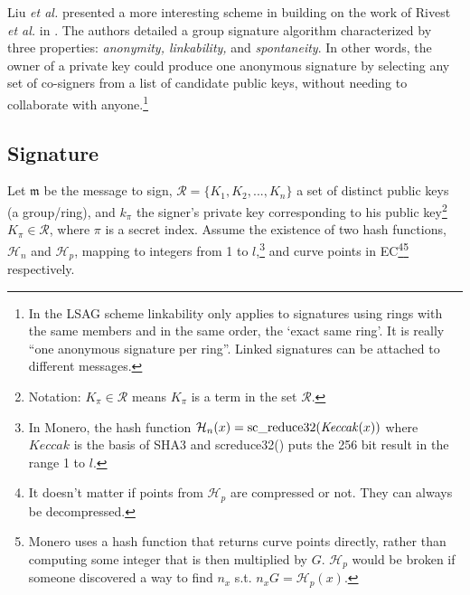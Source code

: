Liu {\em et al.} presented a more interesting scheme in \cite{Liu2004} building on the work of Rivest {\em et al.} in \cite{rivest-leak-secret}. The authors detailed a group signature algorithm characterized by three properties: {\em anonymity, linkability,} and {\em spontaneity}. In other words, the owner of a private key could produce one anonymous signature by selecting any set of co-signers from a list of candidate public keys, without needing to collaborate with anyone.\footnote{\label{lsag_linkability_note}In the LSAG scheme linkability only applies to signatures using rings with the same members and in the same order, the `exact same ring’. It is really ``one anonymous signature per ring”. Linked signatures can be attached to different messages.}


\subsection*{Signature}

Let \(\mathfrak{m}\) be the message to sign, \(\mathcal{R} = \{K_1, K_2, ..., K_n\}\) a set of distinct public keys (a group/ring), and \(k_\pi\) the signer's private key corresponding to his public key\footnote{\label{notation2_note}Notation: $K_{\pi} \in \mathcal{R}$ means $K_{\pi}$ is a term in the set $\mathcal{R}$.} \(K_\pi \in \mathcal{R}\), where $\pi$ is a secret index. Assume the existence of two hash functions, \(\mathcal{H}_n\) and \(\mathcal{H}_p\),
mapping to integers from 1 to $l$,\footnote{In Monero, the hash function $\mathcal{H}_n(x) = \textrm{sc\textunderscore reduce32}(\mathit{Keccak}(x))$ where $\mathit{Keccak}$ is the basis of SHA3 and sc\textunderscore reduce32() puts the 256 bit result in the range 1 to $l$.} and curve points in EC\footnote{It doesn’t matter if points from $\mathcal{H}_p$ are compressed or not. They can always be decompressed.}\footnote{Monero uses a hash function that returns curve points directly, rather than computing some integer that is then multiplied by $G$. $\mathcal{H}_p$ would be broken if someone discovered a way to find $n_x$ s.t. $n_x G = \mathcal{H}_p(x)$.} respectively.

